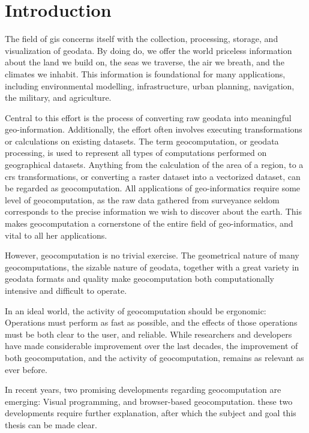 \chapter{Introduction}


The field of \ac{gis} concerns itself with the collection, processing, storage, and visualization of geodata. 
By doing do, we offer the world priceless information about the land we build on, the seas we traverse, the air we breath, and the climates we inhabit. 
This information is foundational for many applications, including environmental modelling, infrastructure, urban planning, navigation, the military, and agriculture.   

Central to this effort is the process of converting raw geodata into meaningful geo-information. 
Additionally, the effort often involves executing transformations or calculations on existing datasets. 
The term \ac{geocomputation}, or geodata processing, is used to represent all types of computations performed on geographical datasets. Anything from the calculation of the area of a region, to a \ac{crs} transformations, or converting a raster dataset into a vectorized dataset, can be regarded as geocomputation.
All applications of geo-informatics require some level of geocomputation, as the raw data gathered from surveyance seldom corresponds to the precise information we wish to discover about the earth.       
This makes geocomputation a cornerstone of the entire field of geo-informatics, and vital to all her applications.

However, geocomputation is no trivial exercise. The geometrical nature of many geocomputations, the sizable nature of geodata,  together with a great variety in geodata formats and quality make geocomputation both computationally intensive and difficult to operate. 
    
In an ideal world, the activity of geocomputation should be ergonomic: Operations must perform as fast as possible, and the effects of those operations must be both clear to the user, and reliable.
While researchers and developers have made considerable improvement over the last decades, the improvement of both geocomputation, and the activity of geocomputation, remains as relevant as ever before. 

In recent years, two promising developments regarding geocomputation are emerging:
Visual programming, and browser-based geocomputation. 
these two developments require further explanation, after which the subject and goal this thesis can be made clear.

